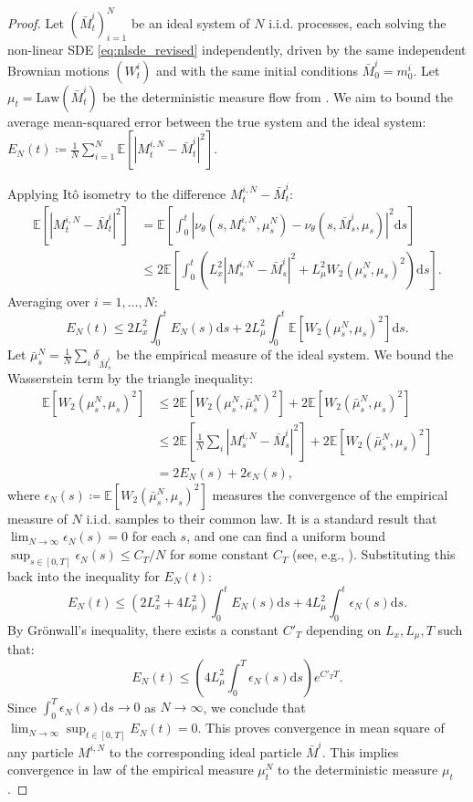 \documentclass[qian]{imsart}
\newcommand{\E}{\mathbb{E}}
\newcommand{\dd}{\mathrm{d}}
\newcommand{\abs}[1]{\left\lvert#1\right\rvert}
\theoremstyle{plain}
\theoremstyle{definition}
\begin{document}
\begin{proof}
Let $(\bar{M}^i_t)_{i=1}^N$ be an ideal system of $N$ i.i.d. processes, each solving the non-linear SDE \eqref{eq:nlsde_revised} independently, driven by the same independent Brownian motions $(W^i_t)$ and with the same initial conditions $\bar{M}^i_0 = m^i_0$. Let $\mu_t = \mathrm{Law}(\bar{M}^i_t)$ be the deterministic measure flow from . We aim to bound the average mean-squared error between the true system and the ideal system: $E_N(t) \coloneqq \frac{1}{N} \sum_{i=1}^N \E[\abs{M^{i,N}_t - \bar{M}^i_t}^2]$.

Applying Itô isometry to the difference $M^{i,N}_t - \bar{M}^i_t$:
\begin{align*}
\E[\abs{M^{i,N}_t - \bar{M}^i_t}^2] &= \E\left[\int_0^t \abs{\nu_\theta(s, M^{i,N}_s, \mu^N_s) - \nu_\theta(s, \bar{M}^i_s, \mu_s)}^2 \dd s\right] \\
&\le 2\E\left[\int_0^t \left(L_x^2\abs{M^{i,N}_s - \bar{M}^i_s}^2 + L_\mu^2 W_2(\mu^N_s, \mu_s)^2 \right) \dd s\right].
\end{align*}
Averaging over $i=1,\dots,N$:
\[ E_N(t) \le 2L_x^2 \int_0^t E_N(s) \dd s + 2L_\mu^2 \int_0^t \E[W_2(\mu^N_s, \mu_s)^2] \dd s. \]
Let $\bar{\mu}^N_s = \frac{1}{N}\sum_i \delta_{\bar{M}^i_s}$ be the empirical measure of the ideal system. We bound the Wasserstein term by the triangle inequality:
\begin{align*}
\E[W_2(\mu^N_s, \mu_s)^2] &\le 2\E[W_2(\mu^N_s, \bar{\mu}^N_s)^2] + 2\E[W_2(\bar{\mu}^N_s, \mu_s)^2] \\
&\le 2\E\left[\frac{1}{N}\sum_i \abs{M^{i,N}_s - \bar{M}^i_s}^2\right] + 2\E[W_2(\bar{\mu}^N_s, \mu_s)^2] \\
&= 2 E_N(s) + 2\epsilon_N(s),
\end{align*}
where $\epsilon_N(s) \coloneqq \E[W_2(\bar{\mu}^N_s, \mu_s)^2]$ measures the convergence of the empirical measure of $N$ i.i.d. samples to their common law. It is a standard result that $\lim_{N\to\infty} \epsilon_N(s) = 0$ for each $s$, and one can find a uniform bound $\sup_{s \in [0,T]} \epsilon_N(s) \le C_T/N$ for some constant $C_T$ (see, e.g., \cite[Vol I]{CarmonaDelarue2018}).
Substituting this back into the inequality for $E_N(t)$:
\[ E_N(t) \le (2L_x^2 + 4L_\mu^2) \int_0^t E_N(s) \dd s + 4L_\mu^2 \int_0^t \epsilon_N(s) \dd s. \]
By Grönwall's inequality, there exists a constant $C'_{T}$ depending on $L_x, L_\mu, T$ such that:
\[ E_N(t) \le \left(4L_\mu^2 \int_0^T \epsilon_N(s) \dd s\right) e^{C'_{T} T}. \]
Since $\int_0^T \epsilon_N(s) \dd s \to 0$ as $N \to \infty$, we conclude that $\lim_{N \to \infty} \sup_{t \in [0,T]} E_N(t) = 0$. This proves convergence in mean square of any particle $M^{i,N}$ to the corresponding ideal particle $\bar{M}^i$. This implies convergence in law of the empirical measure $\mu^N_t$ to the deterministic measure $\mu_t$.
\end{proof}
\end{document}
